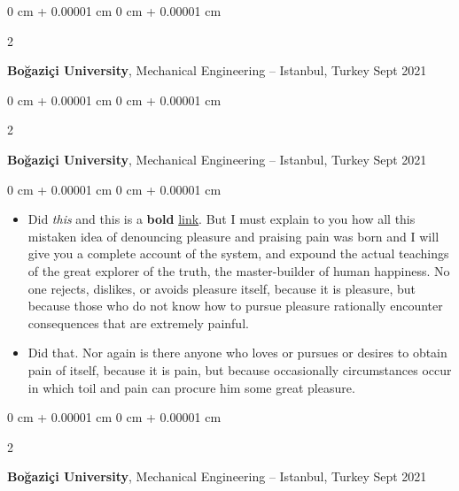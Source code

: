 \documentclass[10pt, letterpaper]{article}
\newenvironment{highlights}{
    \begin{itemize}[
        topsep=0.10 cm,
        parsep=0.10 cm,
        partopsep=0pt,
        itemsep=0pt,
        leftmargin=0 cm + 10pt
    ]
}{
    \end{itemize}
} %
\newenvironment{onecolentry}{
    \begin{adjustwidth}{
        0 cm + 0.00001 cm
    }{
        0 cm + 0.00001 cm
    }
}{
    \end{adjustwidth}
} %
\newenvironment{twocolentry}[2][]{
    \onecolentry
    \def\secondColumn{#2}
    \setcolumnwidth{\fill, 4.5 cm}
    \begin{paracol}{2}
}{
    \switchcolumn \raggedleft \secondColumn
    \end{paracol}
    \endonecolentry
} %
\begin{document}
        \vspace{0.2 cm}

        \begin{twocolentry}{
            Sept 2021
        }
            \textbf{Boğaziçi University}, Mechanical Engineering -- Istanbul, Turkey\end{twocolentry}



        \vspace{0.2 cm}

        \begin{twocolentry}{
            Sept 2021
        }
            \textbf{Boğaziçi University}, Mechanical Engineering -- Istanbul, Turkey\end{twocolentry}

        \vspace{0.10 cm}
        \begin{onecolentry}
            \begin{highlights}
                \item Did \textit{this} and this is a \textbf{bold} \href{https://example.com}{link}. But I must explain to you how all this mistaken idea of denouncing pleasure and praising pain was born and I will give you a complete account of the system, and expound the actual teachings of the great explorer of the truth, the master-builder of human happiness. No one rejects, dislikes, or avoids pleasure itself, because it is pleasure, but because those who do not know how to pursue pleasure rationally encounter consequences that are extremely painful.
                \item Did that. Nor again is there anyone who loves or pursues or desires to obtain pain of itself, because it is pain, but because occasionally circumstances occur in which toil and pain can procure him some great pleasure.
            \end{highlights}
        \end{onecolentry}


        \vspace{0.2 cm}

        \begin{twocolentry}{
            Sept 2021
        }
            \textbf{Boğaziçi University}, Mechanical Engineering -- Istanbul, Turkey\end{twocolentry}
\end{document}
